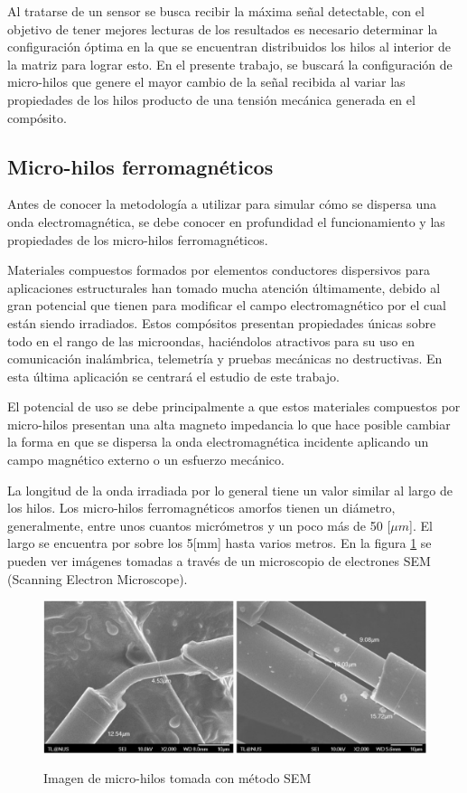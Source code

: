 \documentclass[12pt,letterpaper]{article}
\numberwithin{equation}{section}
\begin{document}
Al tratarse de un sensor se busca recibir la máxima señal detectable, con el objetivo de tener mejores lecturas de los resultados es necesario determinar la configuración óptima en la que se encuentran distribuidos los hilos al interior de la matriz para lograr esto. En el presente trabajo, se buscará la configuración de micro-hilos que genere el mayor cambio de la señal recibida al variar las propiedades de los hilos producto de una tensión mecánica generada en el compósito.   

\subsection{Micro-hilos ferromagnéticos} \label{subsec Microhilos ferromagneticos}
Antes de conocer la metodología a utilizar para simular cómo se dispersa una onda electromagnética, se debe conocer en profundidad el funcionamiento y las propiedades de los micro-hilos ferromagnéticos. 

Materiales compuestos formados por elementos conductores dispersivos para aplicaciones estructurales han tomado mucha atención últimamente, debido al gran potencial que tienen para modificar el campo electromagnético por el cual están siendo irradiados. Estos compósitos presentan propiedades únicas sobre todo en el rango de las microondas, haciéndolos atractivos para su uso en comunicación inalámbrica, telemetría y pruebas mecánicas no destructivas. En esta última aplicación se centrará el estudio de este trabajo.

El potencial de uso se debe principalmente a que estos materiales compuestos por micro-hilos presentan una alta magneto impedancia lo que hace posible cambiar la forma en que se dispersa la onda electromagnética incidente aplicando un campo magnético externo o un esfuerzo mecánico. 

La longitud de la onda irradiada por lo general tiene un valor similar al largo de los hilos. Los micro-hilos ferromagnéticos amorfos tienen un diámetro, generalmente, entre unos cuantos micrómetros y un poco más de 50 [$\mu m$]. El largo se encuentra por sobre los 5[mm] hasta varios metros. En la figura \ref{fig:SEM} se pueden ver imágenes tomadas a través de un microscopio de electrones SEM (Scanning Electron Microscope).

\begin{figure}[H]
	\centering\includegraphics[scale=0.3]{Imagenes/MEB.png}\\
	\caption{Imagen de micro-hilos tomada con método SEM}
	\label{fig:SEM}
\end{figure} 
\end{document}
